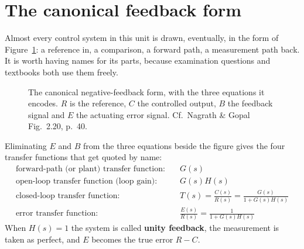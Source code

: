 \documentclass[11pt,a4paper]{article}
\renewcommand{\sumsign}[3]{\node[font=\scriptsize] at ($(#1)+(#2:0.72)$) {$#3$};}
\begin{document}
\section{The canonical feedback form}
\label{sec:canonical}

Almost every control system in this unit is drawn, eventually, in the form of
Figure~\ref{fig:canonical}: a reference in, a comparison, a forward path, a
measurement path back. It is worth having names for its parts, because
examination questions and textbooks both use them freely.

\begin{figure}[htbp]
\centering
{}
\caption{The canonical negative-feedback form, with the three equations it
encodes. $R$ is the reference, $C$ the controlled output, $B$ the feedback
signal and $E$ the actuating error signal. Cf.\ Nagrath \& Gopal Fig.~2.20,
p.~40.}
\label{fig:canonical}
\end{figure}

Eliminating $E$ and $B$ from the three equations beside the figure gives the
four transfer functions that get quoted by name:
\begin{align}
  \text{forward-path (or plant) transfer function:}\quad & G(s) \nonumber\\
  \text{open-loop transfer function (loop gain):}\quad & G(s)H(s) \nonumber\\
  \text{closed-loop transfer function:}\quad & T(s)=\frac{C(s)}{R(s)}
    = \frac{G(s)}{1+G(s)H(s)} \label{eq:closedloop}\\
  \text{error transfer function:}\quad & \frac{E(s)}{R(s)}
    = \frac{1}{1+G(s)H(s)} \label{eq:errortf}
\end{align}
When $H(s)=1$ the system is called \textbf{unity feedback}, the measurement is
taken as perfect, and $E$ becomes the true error $R-C$.
\end{document}

